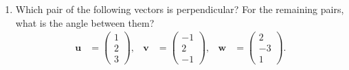\documentclass[a4paper,11pt]{article}
\begin{document}
\begin{enumerate}[label=3.\arabic*]
    \item Which pair of the following vectors is perpendicular? For the remaining pairs, what is the angle between them?
    \begin{align*}
        \mathbf{u} &= \begin{pmatrix} 1 \\ 2 \\ 3 \end{pmatrix}, &
        \mathbf{v} &= \begin{pmatrix} -1 \\ 2 \\ -1 \end{pmatrix}, &
        \mathbf{w} &= \begin{pmatrix} 2 \\ -3 \\ 1 \end{pmatrix}.
    \end{align*}
\end{enumerate}
\end{document}
